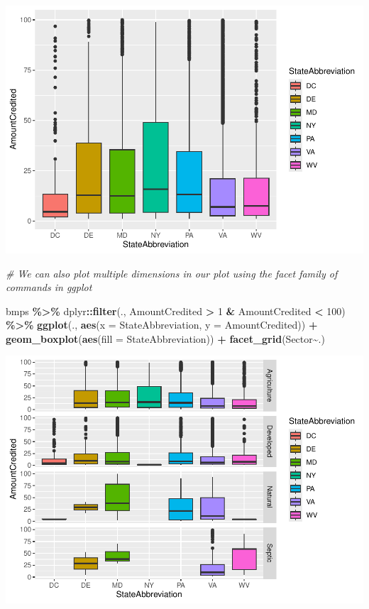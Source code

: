 \documentclass[]{article}
\newenvironment{Shaded}{\begin{snugshade}}{\end{snugshade}}
\newcommand{\AttributeTok}[1]{\textcolor[rgb]{0.13,0.29,0.53}{#1}}
\newcommand{\CommentTok}[1]{\textcolor[rgb]{0.56,0.35,0.01}{\textit{#1}}}
\newcommand{\DecValTok}[1]{\textcolor[rgb]{0.00,0.00,0.81}{#1}}
\newcommand{\FunctionTok}[1]{\textcolor[rgb]{0.13,0.29,0.53}{\textbf{#1}}}
\newcommand{\NormalTok}[1]{#1}
\newcommand{\SpecialCharTok}[1]{\textcolor[rgb]{0.81,0.36,0.00}{\textbf{#1}}}
\begin{document}
\includegraphics{lab02_files/figure-latex/review3-2.pdf}

\begin{Shaded}
\begin{Highlighting}[]
\CommentTok{\# We can also plot multiple dimensions in our plot using the \textasciigrave{}facet\textasciigrave{} family of commands in ggplot}

\NormalTok{bmps }\SpecialCharTok{\%\textgreater{}\%} 
\NormalTok{  dplyr}\SpecialCharTok{::}\FunctionTok{filter}\NormalTok{(., AmountCredited }\SpecialCharTok{\textgreater{}} \DecValTok{1} \SpecialCharTok{\&}\NormalTok{ AmountCredited }\SpecialCharTok{\textless{}} \DecValTok{100}\NormalTok{) }\SpecialCharTok{\%\textgreater{}\%} 
  \FunctionTok{ggplot}\NormalTok{(., }\FunctionTok{aes}\NormalTok{(}\AttributeTok{x =}\NormalTok{ StateAbbreviation, }\AttributeTok{y =}\NormalTok{ AmountCredited)) }\SpecialCharTok{+}
  \FunctionTok{geom\_boxplot}\NormalTok{(}\FunctionTok{aes}\NormalTok{(}\AttributeTok{fill =}\NormalTok{ StateAbbreviation)) }\SpecialCharTok{+}
  \FunctionTok{facet\_grid}\NormalTok{(Sector}\SpecialCharTok{\textasciitilde{}}\NormalTok{.)}
\end{Highlighting}
\end{Shaded}

\includegraphics{lab02_files/figure-latex/review3-3.pdf}
\end{document}
